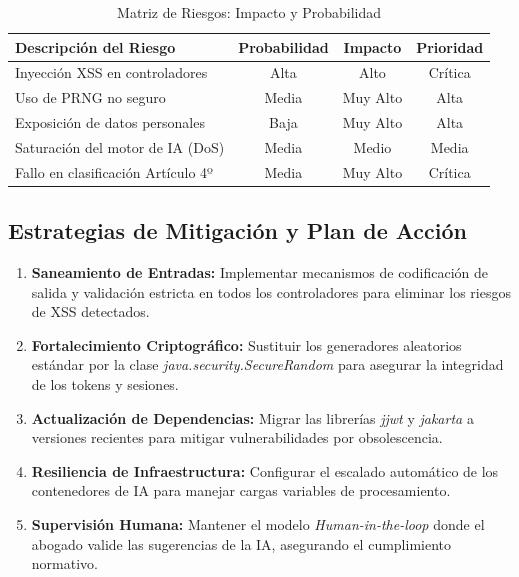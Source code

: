 \begin{table}[h!]
\centering
\caption{Matriz de Riesgos: Impacto y Probabilidad}
\label{tab:matriz_riesgos_tesis}
\begin{tabular}{|l|c|c|c|}
\hline
\textbf{Descripción del Riesgo} & \textbf{Probabilidad} & \textbf{Impacto} & \textbf{Prioridad} \\ \hline
Inyección XSS en controladores & Alta & Alto & Crítica \\ \hline
Uso de PRNG no seguro & Media & Muy Alto & Alta \\ \hline
Exposición de datos personales & Baja & Muy Alto & Alta \\ \hline
Saturación del motor de IA (DoS) & Media & Medio & Media \\ \hline
Fallo en clasificación Artículo 4º & Media & Muy Alto & Crítica \\ \hline
\end{tabular}
\end{table}

\subsection{Estrategias de Mitigación y Plan de Acción}
\begin{enumerate}
    \item \textbf{Saneamiento de Entradas:} Implementar mecanismos de codificación de salida y validación estricta en todos los controladores para eliminar los riesgos de XSS detectados.
    \item \textbf{Fortalecimiento Criptográfico:} Sustituir los generadores aleatorios estándar por la clase \textit{java.security.SecureRandom} para asegurar la integridad de los tokens y sesiones.
    \item \textbf{Actualización de Dependencias:} Migrar las librerías \textit{jjwt} y \textit{jakarta} a versiones recientes para mitigar vulnerabilidades por obsolescencia.
    \item \textbf{Resiliencia de Infraestructura:} Configurar el escalado automático de los contenedores de IA para manejar cargas variables de procesamiento.
    \item \textbf{Supervisión Humana:} Mantener el modelo \textit{Human-in-the-loop} donde el abogado valide las sugerencias de la IA, asegurando el cumplimiento normativo.
\end{enumerate}